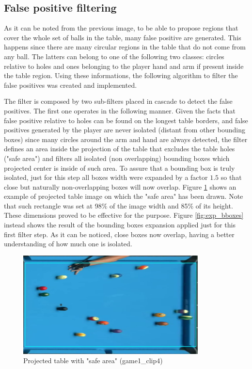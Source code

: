\subsection{False positive filtering}
As it can be noted from the previous image, to be able to propose regions that cover the whole set of balls in the table, many 
false positive are generated. This happens since there are many circular regions in the table that do not come from any ball.
The latters can belong to one of the following two classes: circles relative to holes and ones belonging to the player hand and arm if present 
inside the table region. Using these informations, the following algorithm to filter the false positives was created and implemented.

The filter is composed by two sub-filters placed in cascade to detect the false positives.
The first one operates in the following manner. Given the facts that false positive relative to holes can be found on the longest table
borders, and false positives generated by the player are never isolated (distant from other bounding boxes) since
many circles around the arm and hand are always detected, the filter defines an area inside the projection of the table that excludes
the table holes ("safe area") and filters all isolated (non overlapping) bounding boxes which projected center is inside of such area.
To assure that a bounding box is truly isolated, just for this step all boxes width were expanded by a factor $1.5$ so that close but naturally
non-overlapping boxes will now overlap. Figure \ref{fig:safe_area} shows an example of projected table image on which the "safe area" has been drawn.
Note that such rectangle was set at 98\% of the image width and 85\% of its height. These dimensions proved to be effective for the purpose. 
Figure \ref{fig:exp_bboxes} instead shows the result of the bounding boxes expansion applied just for this first filter step. As it can be noticed, close
boxes now overlap, having a better understanding of how much one is isolated.\\
\begin{figure}[h]
    \centering
    \includegraphics[width=0.85\textwidth]{imgs/ball_localization/safe_area.jpg}
    \caption{Projected table with "safe area" (game1\_clip4)}
    \label{fig:safe_area}
\end{figure}
